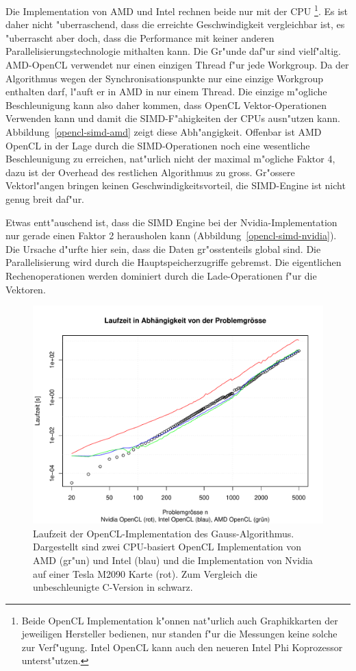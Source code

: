 Die Implementation von AMD und Intel rechnen beide nur mit der CPU%
\footnote{Beide OpenCL Implementation k"onnen nat"urlich auch Graphikkarten
der jeweiligen Hersteller bedienen, nur standen f"ur die Messungen
keine solche zur Verf"ugung. Intel OpenCL kann auch den neueren Intel Phi
Koprozessor unterst"utzen.}.
Es ist daher nicht "uberraschend, dass die erreichte Geschwindigkeit
vergleichbar ist, es "uberrascht aber doch, dass die Performance mit
keiner anderen Parallelisierungstechnologie mithalten kann.
Die Gr"unde daf"ur sind vielf"altig. AMD-OpenCL verwendet nur einen
einzigen Thread f"ur jede Workgroup.
Da der Algorithmus wegen der Synchronisationspunkte nur eine einzige Workgroup
enthalten darf, l"auft er in AMD in nur einem Thread. Die einzige
m"ogliche Beschleunigung kann also daher kommen, dass OpenCL Vektor-Operationen
Verwenden kann und damit die SIMD-F"ahigkeiten der CPUs ausn"utzen kann.
Abbildung~\ref{opencl-simd-amd} zeigt diese Abh"angigkeit.
Offenbar ist AMD OpenCL in der Lage durch die SIMD-Operationen noch eine 
wesentliche Beschleunigung zu erreichen, nat"urlich nicht der maximal
m"ogliche Faktor 4, dazu ist der Overhead des restlichen Algorithmus
zu gross.
Gr"ossere Vektorl"angen bringen keinen Geschwindigkeitsvorteil, die
SIMD-Engine ist nicht genug breit daf"ur.

Etwas entt"auschend ist, dass die SIMD Engine bei der Nvidia-Implementation 
nur gerade einen Faktor 2 herausholen kann (Abbildung~\ref{opencl-simd-nvidia}).
Die Ursache d"urfte hier sein, dass die Daten gr"osstenteils global sind.
Die Parallelisierung wird durch die Hauptspeicherzugriffe gebremst.
Die eigentlichen Rechenoperationen werden dominiert durch die Lade-Operationen
f"ur die Vektoren.

\begin{figure}
\begin{center}
\includegraphics[width=\hsize]{images/gauss-opencl.pdf}
\end{center}
\caption{Laufzeit der OpenCL-Implementation des Gauss-Algorithmus.
Dargestellt sind
zwei CPU-basiert OpenCL Implementation von AMD (gr"un) und Intel (blau)
und die Implementation von Nvidia auf einer Tesla M2090 Karte (rot).
Zum Vergleich die unbeschleunigte C-Version in schwarz.
\label{opencl-results}}
\end{figure}

